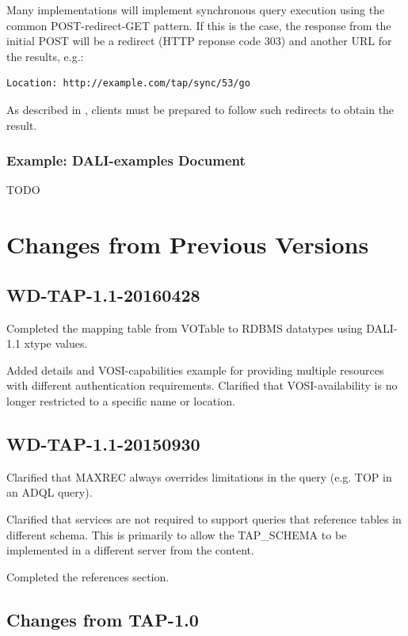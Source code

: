 \documentclass[11pt,letter]{ivoa}
\begin{document}
Many implementations will implement synchronous query execution using the 
common POST-redirect-GET pattern. If this is the case, the response from the 
initial POST will be a redirect (HTTP reponse code 303) and another URL for the 
results, e.g.: 

\begin{verbatim}
Location: http://example.com/tap/sync/53/go
\end{verbatim}

As described in \citep{std:DALI}, clients must be prepared to follow such 
redirects to obtain the result.

\subsubsection{Example: DALI-examples Document}

TODO

\appendix

\section{Changes from Previous Versions}

\subsection{WD-TAP-1.1-20160428}

Completed the mapping table from VOTable to RDBMS datatypes using DALI-1.1 xtype values.

Added details and VOSI-capabilities example for providing multiple resources with different 
authentication requirements. Clarified that VOSI-availability is no longer restricted to a
specific name or location.

\subsection{WD-TAP-1.1-20150930}

Clarified that MAXREC always overrides limitations in the query (e.g. 
TOP in an ADQL query).

Clarified that services are not required to support queries that reference tables 
in different schema. This is primarily to allow the TAP\_SCHEMA to be implemented 
in a different server from the content.

Completed the references section.

\subsection{Changes from TAP-1.0}
\end{document}
